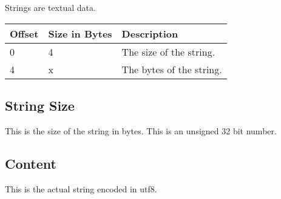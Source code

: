 Strings are textual data.

\begin{table}[h]
    \centering
    \label{tbl:strings}
        \begin{tabular}{|l|l|l|}
        \hline
        \textbf{Offset} & \textbf{Size in Bytes} & \textbf{Description}     \\ \hline
        0               & 4                      & The size of the string.  \\ \hline
        4               & x                      & The bytes of the string. \\ \hline
    \end{tabular}
\end{table}

\subsection{String Size}
This is the size of the string in bytes. This is an unsigned 32 bit number.

\subsection{Content}
This is the actual string encoded in utf8.